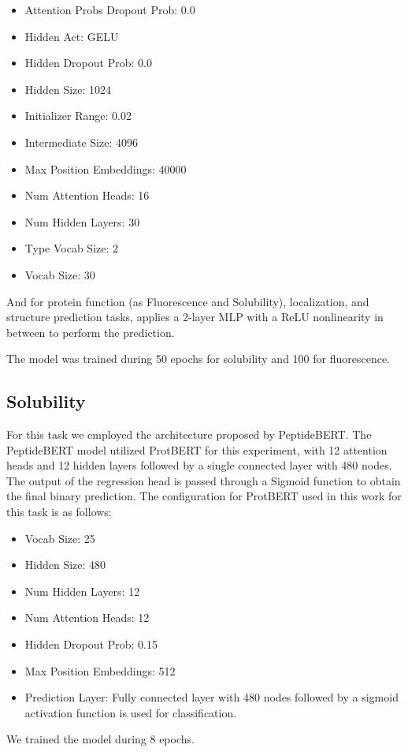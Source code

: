 \documentclass[letterpaper,spanish,reprint,nofootinbib,showkeys,aps]{revtex4-2}
\begin{document}
\begin{itemize}
   \item Attention Probs Dropout Prob: 0.0
\item Hidden Act: GELU
\item Hidden Dropout Prob: 0.0
\item Hidden Size: 1024
\item Initializer Range: 0.02
\item Intermediate Size: 4096
\item Max Position Embeddings: 40000
\item Num Attention Heads: 16
\item Num Hidden Layers: 30
\item Type Vocab Size: 2
\item Vocab Size: 30
\end{itemize}
And for protein function (as Fluorescence and Solubility), localization, and structure prediction tasks, applies a 2-layer MLP with a ReLU nonlinearity in between to perform the prediction. 

The model was trained during 50 epochs for solubility and 100 for fluorescence.
\subsection*{Solubility}

For this task we employed the architecture proposed by PeptideBERT. The PeptideBERT model utilized ProtBERT for this experiment, with 12 attention heads and 12 hidden layers followed by a single connected layer with 480 nodes. The output of the regression head is passed through a Sigmoid function to obtain the final binary prediction. The configuration for ProtBERT used in this work for this task is as follows:

\begin{itemize}

\item Vocab Size: 25
\item Hidden Size: 480
\item Num Hidden Layers: 12
\item Num Attention Heads: 12
\item Hidden Dropout Prob: 0.15
\item Max Position Embeddings: 512
\item Prediction Layer: Fully connected layer with 480 nodes followed by a sigmoid activation function is used for classification.
\end{itemize}
We trained the model during 8 epochs.
\end{document}
